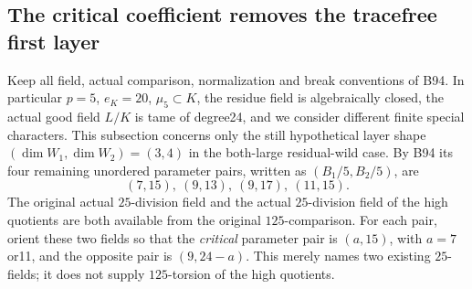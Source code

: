 \subsection{The critical coefficient removes the tracefree first layer}

Keep all field, actual comparison, normalization and break conventions
of B94. In particular $p=5$, $e_K=20$, $\mu _5\subset K$, the residue
field is algebraically closed, the actual good field $L/K$ is tame
of degree24, and we consider different finite special characters.
This subsection concerns only the still hypothetical layer shape
$(\dim W_1,\dim W_2)=(3,4)$ in the both-large residual-wild case.
By B94 its four remaining unordered parameter pairs, written as
$(B_1/5,B_2/5)$, are
\[
                 (7,15),\ (9,13),\ (9,17),\ (11,15). \tag{B-RD95.1}
\]
The original actual $25$-division field and the actual $25$-division
field of the high quotients are both available from the original
$125$-comparison. For each pair, orient these two fields so that
the \emph{critical} parameter pair is $(a,15)$, with $a=7$ or11,
and the opposite pair is $(9,24-a)$. This merely names two existing
$25$-fields; it does not supply $125$-torsion of the high quotients.

